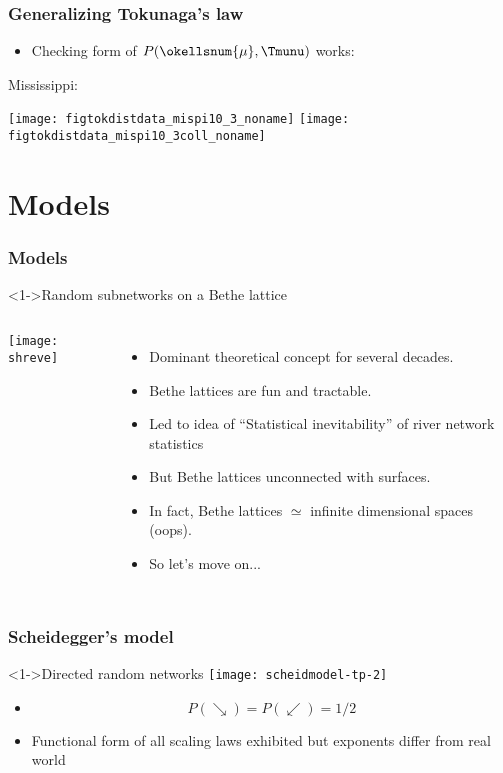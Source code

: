 \begin{frame}[label=]
  \frametitle{Generalizing Tokunaga's law}

  \begin{itemize}
  \item Checking form of $P(\okellsnum{\mu},\Tmunu)$ works:
  \end{itemize}

  Mississippi:
  
      \texttt{[image: figtokdistdata\_mispi10\_3\_noname]}
      \texttt{[image: figtokdistdata\_mispi10\_3coll\_noname]}

\end{frame}



\section{Models}

\begin{frame}[label=]
  \frametitle{Models}

  \begin{block}<1->{Random subnetworks on a Bethe lattice\cite{shreve1967a}}
    \begin{columns}
      \texttt{[image: shreve]}
      \begin{itemize}
      \item<2-> Dominant theoretical concept for several decades.
      \item<3-> Bethe lattices are fun and tractable.
      \item<4-> Led to idea of ``Statistical inevitability'' of river network statistics\cite{kirchner1993a}
      \item<5-> But Bethe lattices unconnected with surfaces.
      \item<6-> In fact, Bethe lattices $\simeq$ infinite dimensional spaces (oops).
      \item<7-> So let's move on...
      \end{itemize}
    \end{columns}
  \end{block}

\end{frame}

\begin{frame}[label=]
  \frametitle{Scheidegger's model}

  \begin{block}<1->{Directed random networks\cite{scheidegger1967a,scheidegger1991a}}
    \texttt{[image: scheidmodel-tp-2]}
    \begin{itemize}
    \item<1->
      $$P(\searrow) = P (\swarrow) = 1/2$$
    \item<1->
      Functional form of all scaling laws exhibited
      but exponents differ from real world\cite{takayasu1988a,takayasu1989a,takayasu1989b}
    \end{itemize}
  \end{block}

\end{frame}


